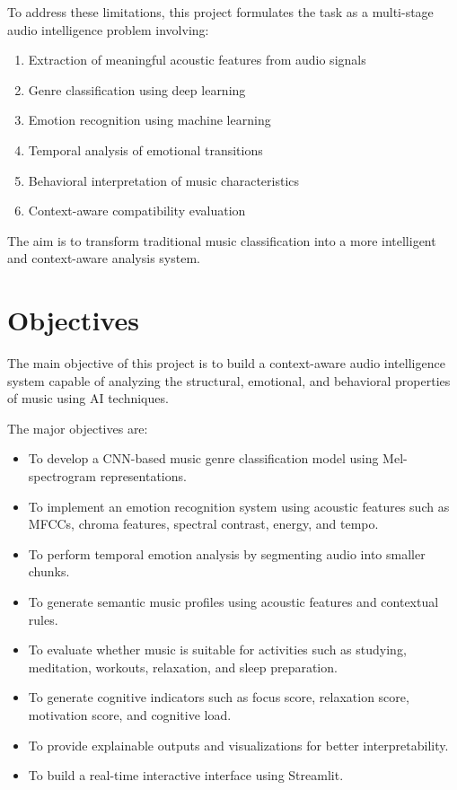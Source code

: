 \documentclass[12pt,a4paper]{report}
\begin{document}
To address these limitations, this project formulates the task as a multi-stage audio intelligence problem involving:

\begin{enumerate}
    \item Extraction of meaningful acoustic features from audio signals
    \item Genre classification using deep learning
    \item Emotion recognition using machine learning
    \item Temporal analysis of emotional transitions
    \item Behavioral interpretation of music characteristics
    \item Context-aware compatibility evaluation
\end{enumerate}

The aim is to transform traditional music classification into a more intelligent and context-aware analysis system.

\newpage

\section{Objectives}

The main objective of this project is to build a context-aware audio intelligence system capable of analyzing the structural, emotional, and behavioral properties of music using AI techniques.

The major objectives are:

\begin{itemize}

    \item To develop a CNN-based music genre classification model using Mel-spectrogram representations.

    \item To implement an emotion recognition system using acoustic features such as MFCCs, chroma features, spectral contrast, energy, and tempo.

    \item To perform temporal emotion analysis by segmenting audio into smaller chunks.

    \item To generate semantic music profiles using acoustic features and contextual rules.

    \item To evaluate whether music is suitable for activities such as studying, meditation, workouts, relaxation, and sleep preparation.

    \item To generate cognitive indicators such as focus score, relaxation score, motivation score, and cognitive load.

    \item To provide explainable outputs and visualizations for better interpretability.

    \item To build a real-time interactive interface using Streamlit.

\end{itemize}
\end{document}
